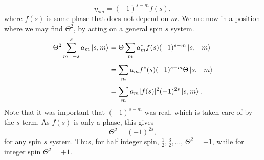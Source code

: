 \begin{equation}
  \eta _{sm} = (-1)^{s-m} f(s),
\end{equation}
where  $f(s)$  is some phase that does not depend on $m$.
We are now in a position where we may find $\Theta ^2$, by acting on a general spin $s$ system.
\begin{align}
  \Theta ^2 \sum\limits_{m = -s}^s a_m \ket{s, m} &= \Theta  \sum\limits_m^{} a^{*}_m f(s) (-1)^{s-m} \ket{s, -m}\\
                                                  &= \sum\limits_m^{} a_m f^{*}(s) (-1)^{s-m} \Theta \ket{s, -m}\\
  &= \sum\limits_m^{} a_m |f(s)|^2 (-1)^{2s} \ket{s, m}.
\end{align}
Note that it was important that $(-1)^{s-m}$ was real, which is taken care of by the $s$-term.
As $f(s)$ is only a phase, this gives
\begin{equation}
  \Theta ^2 = (-1)^{2s},
\end{equation}
for any spin $s$ system.
Thus, for half integer spin, $\frac{1}{2}, \frac{3}{2}, \dots $, $\Theta ^2 = -1$, while for integer spin $\Theta ^2= +1$.


\begin{comment}
  We implement this by letting the time reversal operator be a $\pi $ rotation of the spin, around some axis.
  Following the convention of considering this as a rotation around the $y$-axis, the $\Theta = UK$ operator gets the form~\cite{bernevigTopologicalInsulatorsTopological2013}
  $$
  \Theta = \eta e^{-i\pi S_y} K,
  $$
  where $\eta$ is some arbitrary phase and $S_y$ is the spin operator in the $y$-direction.
  Also, $\hbar = 1$ for ease of notation.
  Taylor expanding the exponential, splitting the terms into the $\sin$ and $\cos$ terms, and noting that
  \todo{TODO write something more legit here.}
  $$
  S_y^2 = \frac{1}{2}
  $$
  we can simplify the expression for $\Theta$.
  \begin{equation}
    \Theta = - i \eta \left(2 S_y\right) K.
  \end{equation}
  Thus, one gets
  \begin{equation}
    \Theta^2 =
    4 i \eta^2 S_y K i  S_y K =
    4 i \eta^2 S_y (-i S_y^*) =
    4 i \eta^2 S_y S_y^* =
    -4 i \eta^2 S_y^2.
  \end{equation}
\end{comment}
